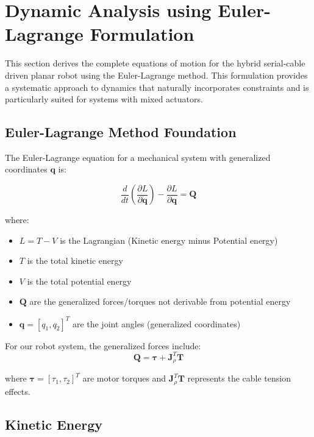 \section{Dynamic Analysis using Euler-Lagrange Formulation}

This section derives the complete equations of motion for the hybrid serial-cable driven planar robot using the Euler-Lagrange method. This formulation provides a systematic approach to dynamics that naturally incorporates constraints and is particularly suited for systems with mixed actuators.

\subsection{Euler-Lagrange Method Foundation}

The Euler-Lagrange equation for a mechanical system with generalized coordinates $\mathbf{q}$ is:

\begin{equation}
\frac{d}{dt}\left(\frac{\partial L}{\partial \dot{\mathbf{q}}}\right) - \frac{\partial L}{\partial \mathbf{q}} = \mathbf{Q}
\end{equation}

where:
\begin{itemize}
    \item $L = T - V$ is the Lagrangian (Kinetic energy minus Potential energy)
    \item $T$ is the total kinetic energy
    \item $V$ is the total potential energy
    \item $\mathbf{Q}$ are the generalized forces/torques not derivable from potential energy
    \item $\mathbf{q} = [q_1, q_2]^T$ are the joint angles (generalized coordinates)
\end{itemize}

For our robot system, the generalized forces include:
\begin{equation}
\mathbf{Q} = \boldsymbol{\tau} + \mathbf{J}_{\rho}^T \mathbf{T}
\end{equation}

where $\boldsymbol{\tau} = [\tau_1, \tau_2]^T$ are motor torques and $\mathbf{J}_{\rho}^T \mathbf{T}$ represents the cable tension effects.

\subsection{Kinetic Energy}

